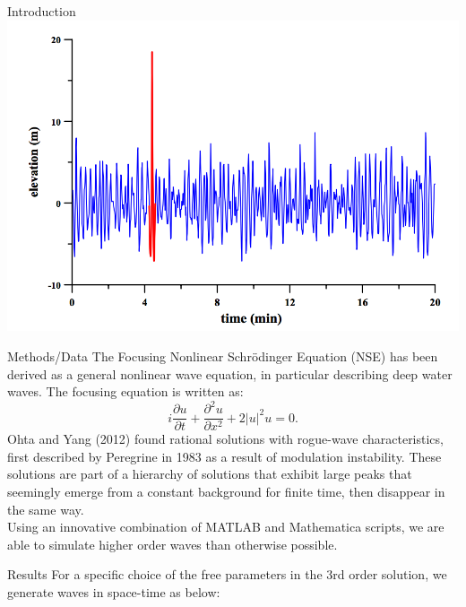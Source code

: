 \documentclass[final]{beamer}
\begin{document}
\begin{frame}{}
\begin{columns}[t]
\begin{column}{.35\linewidth}
\begin{block}{Introduction}
	\centering
\includegraphics[width=600px]{draupner_wave.png}
	\end{block}
	\hspace{0.25cm}
	\begin{block}{Methods/Data}
The Focusing Nonlinear Schr\"{o}dinger Equation (NSE) has been derived as a general nonlinear wave equation, in particular describing deep water waves. The focusing equation is written as: \[ i\frac{\partial u}{\partial t} + \frac{\partial ^2 u}{\partial x^2} + 2 |u| ^2 u = 0 .\] Ohta and Yang (2012) found rational solutions with rogue-wave characteristics, first described by Peregrine in 1983 as a result of modulation instability. These solutions are part of a hierarchy of solutions that exhibit large peaks that seemingly emerge from a constant background for finite time, then disappear in the same way.\\
\vspace{5mm}
Using an innovative combination of MATLAB and Mathematica scripts, we are able to simulate higher order waves than otherwise possible.
	\end{block}
	\hspace{0.25cm}
	\vspace{-1cm}
  	\begin{block}{Results}
For a specific choice of the free parameters in the 3rd order solution, we generate waves in space-time as below:


\end{block}
\end{column}
\end{columns}
\end{frame}
\end{document}
